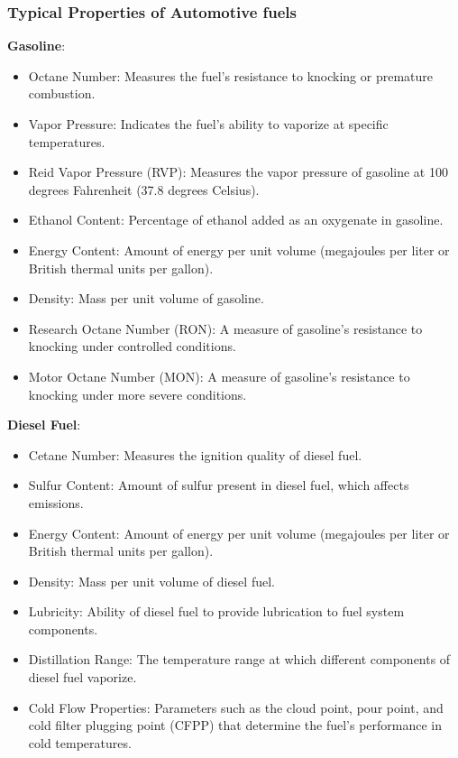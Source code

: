 \documentclass{article}
\begin{document}
\subsubsection*{Typical Properties of Automotive fuels}
\textbf{Gasoline}:
  \begin{itemize}
    \item Octane Number: Measures the fuel's resistance to knocking or premature combustion.
    \item Vapor Pressure: Indicates the fuel's ability to vaporize at specific temperatures.
    \item Reid Vapor Pressure (RVP): Measures the vapor pressure of gasoline at 100 degrees Fahrenheit (37.8 degrees Celsius).
    \item Ethanol Content: Percentage of ethanol added as an oxygenate in gasoline.
    \item Energy Content: Amount of energy per unit volume (megajoules per liter or British thermal units per gallon).
    \item Density: Mass per unit volume of gasoline.
    \item Research Octane Number (RON): A measure of gasoline's resistance to knocking under controlled conditions.
    \item Motor Octane Number (MON): A measure of gasoline's resistance to knocking under more severe conditions.
  \end{itemize}

\textbf{Diesel Fuel}:
    \begin{itemize}
      \item Cetane Number: Measures the ignition quality of diesel fuel.
      \item Sulfur Content: Amount of sulfur present in diesel fuel, which affects emissions.
      \item Energy Content: Amount of energy per unit volume (megajoules per liter or British thermal units per gallon).
      \item Density: Mass per unit volume of diesel fuel.
      \item Lubricity: Ability of diesel fuel to provide lubrication to fuel system components.
      \item Distillation Range: The temperature range at which different components of diesel fuel vaporize.
      \item Cold Flow Properties: Parameters such as the cloud point, pour point, and cold filter plugging point (CFPP) that determine the fuel's performance in cold temperatures.
    \end{itemize}
\end{document}
